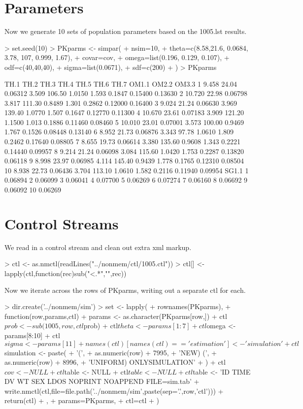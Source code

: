 \section{Parameters}
Now we generate 10 sets of population parameters based on the 1005.lst results.
\begin{Schunk}
\begin{Sinput}
> set.seed(10)
> PKparms <- simpar(
+     nsim=10,
+     theta=c(8.58,21.6, 0.0684, 3.78, 107, 0.999, 1.67),
+     covar=cov,
+     omega=list(0.196, 0.129, 0.107),
+     odf=c(40,40,40),
+     sigma=list(0.0671),
+     sdf=c(200)
+ )
> PKparms
\end{Sinput}
\begin{Soutput}
     TH.1  TH.2    TH.3  TH.4   TH.5   TH.6  TH.7  OM1.1   OM2.2   OM3.3
1   9.458 24.04 0.06312 3.509 106.50 1.0150 1.593 0.1847 0.15400 0.13630
2  10.720 22.98 0.06798 3.817 111.30 0.8489 1.301 0.2862 0.12000 0.16400
3   9.024 21.24 0.06630 3.969 139.40 1.0770 1.507 0.1647 0.12770 0.11300
4  10.670 23.61 0.07183 3.909 121.20 1.1500 1.013 0.1886 0.11460 0.08460
5  10.010 23.01 0.07001 3.573 100.00 0.9469 1.767 0.1526 0.08448 0.13140
6   8.952 21.73 0.06876 3.343  97.78 1.0610 1.809 0.2462 0.17640 0.08805
7   8.655 19.73 0.06614 3.380 135.60 0.9608 1.343 0.2221 0.14440 0.09957
8   9.214 21.24 0.06098 3.084 115.60 1.0420 1.753 0.2287 0.13820 0.06118
9   8.998 23.97 0.06985 4.114 145.40 0.9439 1.778 0.1765 0.12310 0.08504
10  8.938 22.73 0.06436 3.704 113.10 1.0610 1.582 0.2116 0.11940 0.09954
     SG1.1
1  0.06894
2  0.06099
3  0.06041
4  0.07700
5  0.06269
6  0.07274
7  0.06160
8  0.06692
9  0.06092
10 0.06269
\end{Soutput}
\end{Schunk}
\section{Control Streams}
We read in a control stream and clean out extra xml markup.
\begin{Schunk}
\begin{Sinput}
> ctl <- as.nmctl(readLines("../nonmem/ctl/1005.ctl"))
> ctl[] <- lapply(ctl,function(rec)sub("<.*","",rec))
\end{Sinput}
\end{Schunk}
Now we iterate across the rows of PKparms, writing out a separate ctl for each.
\begin{Schunk}
\begin{Sinput}
> dir.create('../nonmem/sim')
> set <- lapply(
+ 	rownames(PKparms),
+ 	function(row,params,ctl){
+ 		params <- as.character(PKparms[row,])
+ 		ctl$prob <- sub(1005,row,ctl$prob)
+ 		ctl$theta <- params[1:7]
+ 		ctl$omega <- params[8:10]
+ 		ctl$sigma <- params[11]
+ 		names(ctl)[names(ctl)=='estimation'] <- 'simulation'
+ 		ctl$simulation <- paste(
+ 			'(',
+ 			as.numeric(row) + 7995,
+ 			'NEW) (',
+ 			as.numeric(row) + 8996,
+ 			'UNIFORM) ONLYSIMULATION'
+ 		)
+ 		ctl$cov <- NULL
+ 		ctl$table <- NULL
+ 		ctl$table <- NULL
+ 		ctl$table <- 'ID TIME DV WT SEX LDOS NOPRINT NOAPPEND FILE=sim.tab'
+ 		write.nmctl(ctl,file=file.path('../nonmem/sim',paste(sep='.',row,'ctl')))
+ 		return(ctl)		
+ 	},
+ 	params=PKparms,
+ 	ctl=ctl
+ )
\end{Sinput}
\end{Schunk}
